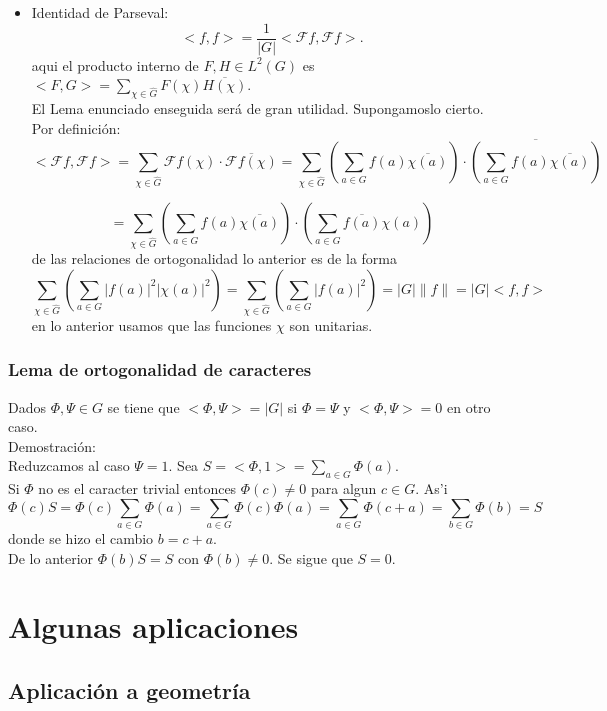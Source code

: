 \documentclass[a4paper,openright,10pt]{article}
\begin{document}
\begin{itemize}
\item Identidad de Parseval: $$
<f,f>=\frac{1}{|G|}<\mathcal{F}f,\mathcal{F}f>.
$$ aqui el producto interno de $F,H \in L^{2}(G)$ es $<F,G>=\sum\limits_{\chi \in \hat{G}} F(\chi) \overline{H(\chi)}$. \\
El Lema enunciado enseguida ser\'a de gran utilidad. Supongamoslo cierto.\\
Por definici\'on: $$
<\mathcal{F}f,\mathcal{F}f>=\sum\limits_{\chi \in \hat{G}} \mathcal{F}f(\chi) \cdot \overline{\mathcal{F}f(\chi)}= \sum\limits_{\chi \in \hat{G}} (\sum\limits_{a\in G}f(a)\overline{\chi(a)})\cdot \overline{(\sum\limits_{a\in G}f(a)\overline{\chi(a)})}
$$

$$
=\sum\limits_{\chi \in \hat{G}} (\sum\limits_{a\in G}f(a)\overline{\chi(a)})\cdot {(\sum\limits_{a\in G}\overline{f(a)} \chi(a))}
$$ de las relaciones de ortogonalidad lo anterior es de la forma $$
\sum\limits_{\chi \in \hat{G}} (\sum\limits_{a\in G}|f(a)|^{2}|\chi(a)|^{2})=\sum\limits_{\chi \in \hat{G}} (\sum\limits_{a\in G}|f(a)|^{2})=|G|\parallel f \parallel = |G|<f,f >
$$ en lo anterior usamos que las funciones $\chi$ son unitarias.
\end{itemize}

\subsubsection{Lema de ortogonalidad de caracteres}
Dados $\Phi, \Psi \in G$ se tiene que $<\Phi, \Psi>=|G|$ si $\Phi= \Psi$ y $<\Phi, \Psi>=0$ en otro caso.\\
Demostraci\'on: \\
Reduzcamos al caso $\Psi=1.$
Sea $
S=<\Phi,1>=\sum\limits_{a\in G} \Phi(a).
$\\
Si $\Phi$ no es el caracter trivial entonces $\Phi(c)\neq 0$ para algun $c\in G.$ As'i
$$\Phi(c)S=\Phi(c) \sum\limits_{a\in G} \Phi(a)=\sum\limits_{a\in G} \Phi(c)\Phi(a)=\sum\limits_{a\in G} \Phi(c+a)=\sum\limits_{b\in G} \Phi(b)=S
$$ donde se hizo el cambio $b=c+a.$\\
De lo anterior $\Phi(b)S=S$ con $\Phi(b)\neq 0.$ Se sigue que $S=0.$

\section{Algunas aplicaciones}

\subsection{Aplicaci\'on a geometr\'ia}
\end{document}
